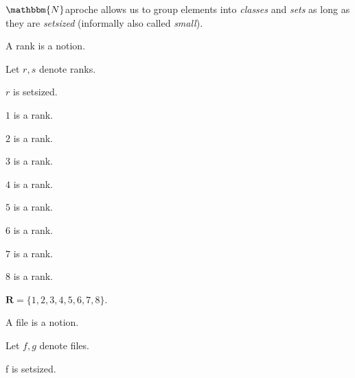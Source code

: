 \documentclass{article}
\newcommand{\Rank}{\mathbf{R}} %
\newcommand{\Naproche}{$\mathbbm{N}$aproche}
\begin{document}
\Naproche{} allows us to group elements into \textit{classes} and \textit{sets} as long as they are \textit{setsized} (informally also called \textit{small}).
\begin{forthel}
    \begin{signature} A rank is a notion. \end{signature}
    Let $r, s$ denote ranks.

    \begin{axiom} $r$ is setsized. \end{axiom}

    \begin{signature} $1$ is a rank. \end{signature}
    \begin{signature} $2$ is a rank. \end{signature}
    \begin{signature} $3$ is a rank. \end{signature}
    \begin{signature} $4$ is a rank. \end{signature}
    \begin{signature} $5$ is a rank. \end{signature}
    \begin{signature} $6$ is a rank. \end{signature}
    \begin{signature} $7$ is a rank. \end{signature}
    \begin{signature} $8$ is a rank. \end{signature}

    \begin{definition} $\Rank = \{1,2,3,4,5,6,7,8\}$. \end{definition}

    \begin{signature} A file is a notion. \end{signature}
    Let $f, g$ denote files.

    \begin{axiom} f is setsized. \end{axiom}


\end{forthel}
\end{document}
